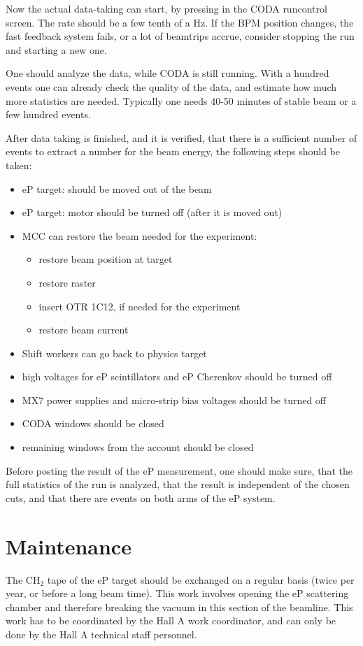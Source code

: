 {Now the actual data-taking can start, by pressing 
in the CODA runcontrol screen. The rate should be a few 
tenth of a Hz. If the BPM position changes, the fast feedback system fails, or a 
lot of beamtrips accrue, consider stopping the run and starting a new 
one.

One should analyze the data, while CODA is still running. 
With a hundred events one can already check the quality of the 
data, and estimate how much more statistics are needed.
Typically one needs 40-50 minutes of stable beam or a few 
hundred events.

After data taking is finished, and it is verified, that there
is a sufficient number of events to extract a number for the beam energy, 
the following steps should be taken:
\begin{itemize}
\item eP target: should be moved out of the beam
\item eP target: motor should be turned off (after it is moved out)
\item MCC can restore the beam needed for the experiment: 
\begin{itemize}
\item restore beam position at target
\item restore raster
\item insert OTR 1C12, if needed for the experiment
\item restore beam current
\end{itemize}
\item Shift workers can go back to physics target
\item high voltages for eP scintillators and eP Cherenkov should be turned off
\item MX7 power supplies and micro-strip bias voltages should be turned off
\item CODA windows should be closed
\item remaining windows from the  account should be closed
\end{itemize}
Before posting the result of the eP measurement, one should make sure,
that the full statistics of the run is analyzed, that the result is 
independent of the chosen cuts, and that there are events on both 
arms of the eP system.

\section{Maintenance}
\label{sec:ep_maintenance}

The CH$_2$ tape of the eP target 
should be exchanged on a regular basis (twice per year, or 
before a long beam time). This work involves opening the 
eP scattering chamber and therefore breaking the vacuum in
this section of the beamline. This work has to be coordinated
by the Hall A work coordinator, and can only be done by the 
Hall A technical staff personnel. 
}

